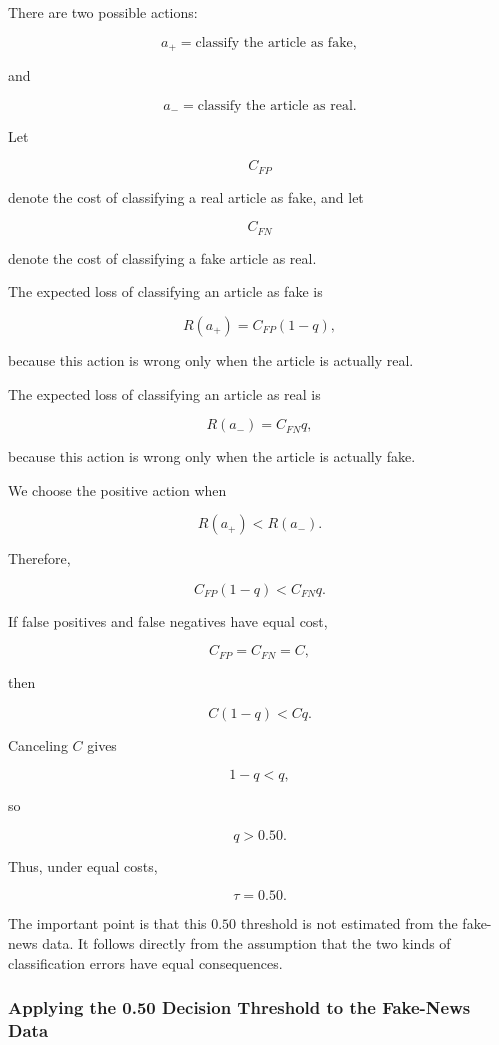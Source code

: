 \documentclass[11pt]{article}
\begin{document}
There are two possible actions:

\[
a_{+} = \text{classify the article as fake},
\]

and

\[
a_{-} = \text{classify the article as real}.
\]

Let

\[
C_{FP}
\]

denote the cost of classifying a real article as fake, and let

\[
C_{FN}
\]

denote the cost of classifying a fake article as real.

The expected loss of classifying an article as fake is

\[
R(a_{+}) = C_{FP}(1-q),
\]

because this action is wrong only when the article is actually real.

The expected loss of classifying an article as real is

\[
R(a_{-}) = C_{FN}q,
\]

because this action is wrong only when the article is actually fake.

We choose the positive action when

\[
R(a_{+}) < R(a_{-}).
\]

Therefore,

\[
C_{FP}(1-q) < C_{FN}q.
\]

If false positives and false negatives have equal cost,

\[
C_{FP}=C_{FN}=C,
\]

then

\[
C(1-q)<Cq.
\]

Canceling $C$ gives

\[
1-q<q,
\]

so

\[
q>0.50.
\]

Thus, under equal costs,

\[
\boxed{\tau=0.50}.
\]

The important point is that this $0.50$ threshold is not estimated from the
fake-news data. It follows directly from the assumption that the two kinds of
classification errors have equal consequences.

\subsubsection*{Applying the 0.50 Decision Threshold to the Fake-News Data}
\end{document}
